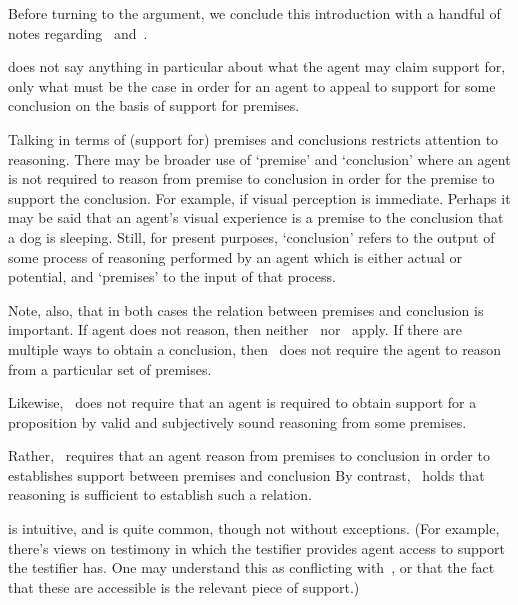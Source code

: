 \begin{note}
  Before turning to the argument, we conclude this introduction with a handful of notes regarding~\uRa{} and~\rC{}.
\end{note}

\begin{note}[Scope of \mp{}]
  \mp{} does not say anything in particular about what the agent may claim support for, only what must be the case in order for an agent to appeal to support for some conclusion on the basis of support for premises.

  Talking in terms of (support for) premises and conclusions restricts attention to reasoning.
  There may be broader use of `premise' and `conclusion' where an agent is not required to reason from premise to conclusion in order for the premise to support the conclusion.
  For example, if visual perception is immediate.
  Perhaps it may be said that an agent's visual experience is a premise to the conclusion that a dog is sleeping.
  Still, for present purposes, `conclusion' refers to the output of some process of reasoning performed by an agent which is either actual or potential, and `premises' to the input of that process.

  Note, also, that in both cases the relation between premises and conclusion is important.
  If agent does not reason, then neither~\bP{} nor~\uRa{} apply.
  If there are multiple ways to obtain a conclusion, then~\uRa{} does not require the agent to reason from a particular set of premises.

  Likewise,~\uRa{} does not require that an agent is required to obtain support for a proposition by valid and subjectively sound reasoning from some premises.

  Rather,~\uRa{} requires that an agent reason from premises to conclusion in order to establishes support between premises and conclusion
  By contrast,~\bP{} holds that reasoning is sufficient to establish such a relation.
\end{note}

\begin{note}[\mp{} is intuitive]
  \uRa{} is intuitive, and is quite common, though not without exceptions.
(For example, there's views on testimony in which the testifier provides agent access to support the testifier has.
One may understand this as conflicting with~\uRa{}, or that the fact that these are accessible is the relevant piece of support.)
\end{note}


